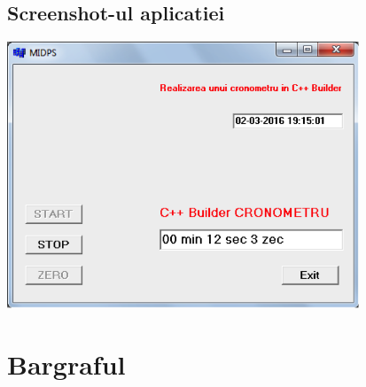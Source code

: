 \documentclass[12pt]{article}
\begin{document}
\subsection{Screenshot-ul aplicatiei}
\includegraphics[width=10.5cm]{images/7}
\section{Bargraful}
\end{document}

